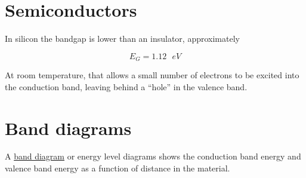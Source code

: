 \begin{Shaded}
\begin{Highlighting}[]
\OperatorTok{=}\NormalTok{ constants.physical\_constants[}\NormalTok{][}\NormalTok{]}
\OperatorTok{=}\NormalTok{ constants.physical\_constants[}\NormalTok{][}\NormalTok{]}

\OperatorTok{=} 
\OperatorTok{=}\OperatorTok{*}\OperatorTok{/}

\OperatorTok{=} 
\OperatorTok{=}\OperatorTok{*}\OperatorTok{/}

\NormalTok{(} \OperatorTok{\%}
\end{Highlighting}
\end{Shaded}

\section{Semiconductors}\label{semiconductors}

In silicon the bandgap is lower than an insulator, approximately

\[E_G = 1.12\text{ } eV\]

At room temperature, that allows a small number of electrons to be
excited into the conduction band, leaving behind a ``hole'' in the
valence band.

\section{Band diagrams}\label{band-diagrams}

A \href{https://en.wikipedia.org/wiki/Band_diagram}{band diagram} or
energy level diagrams shows the conduction band energy and valence band
energy as a function of distance in the material.


